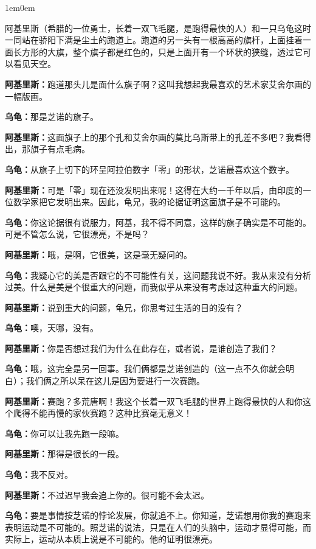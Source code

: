 \documentclass[
  12pt,
  twoside,
  openright,
  oldfontcommands,
]{memoir}
\newcommand{\dialogname}[1]{{\heifamily\bfseries #1}}
\newenvironment{dialogguide}{%
  \begin{adjustwidth}{1em}{0em}\kaitifamily\itshape\small%
}{%
  \end{adjustwidth}%
}
\begin{document}
\begin{dialogguide}
阿基里斯（希腊的一位勇士，长着一双飞毛腿，是跑得最快的人）和一只乌龟这时一同站在骄阳下满是尘土的跑道上。跑道的另一头有一根高高的旗杆，上面挂着一面长方形的大旗，整个旗子都是红色的，只是上面开有一个环状的狭缝，透过它可以看见天空。
\end{dialogguide}

\dialogname{阿基里斯：}跑道那头儿是面什么旗子啊？这叫我想起我最喜欢的艺术家艾舍尔画的一幅版画。

\dialogname{乌龟：}那是芝诺的旗子。

\dialogname{阿基里斯：}这面旗子上的那个孔和艾舍尔画的莫比乌斯带上的孔差不多吧？我看得出，那旗子有点毛病。

\dialogname{乌龟：}从旗子上切下的环呈阿拉伯数字「零」的形状，芝诺最喜欢这个数字。

\dialogname{阿基里斯：}可是「零」现在还没发明出来呢！这得在大约一千年以后，由印度的一位数学家把它发明出来。因此，龟兄，我的论据证明这面旗子是不可能的。

\dialogname{乌龟：}你这论据很有说服力，阿基，我不得不同意，这样的旗子确实是不可能的。可是不管怎么说，它很漂亮，不是吗？

\dialogname{阿基里斯：}哦，是啊，它很美，这是毫无疑问的。

\dialogname{乌龟：}我疑心它的美是否跟它的不可能性有关，这问题我说不好。我从来没有分析过美。什么是美是个很重大的问题，而我似乎从来没有考虑过这种重大的问题。

\dialogname{阿基里斯：}说到重大的问题，龟兄，你思考过生活的目的没有？

\dialogname{乌龟：}噢，天哪，没有。

\dialogname{阿基里斯：}你是否想过我们为什么在此存在，或者说，是谁创造了我们？

\dialogname{乌龟：}哦，这完全是另一回事。我们俩都是芝诺创造的（这一点不久你就会明白）；我们俩之所以呆在这儿是因为要进行一次赛跑。

\dialogname{阿基里斯：}赛跑？多荒唐啊！我这个长着一双飞毛腿的世界上跑得最快的人和你这个爬得不能再慢的家伙赛跑？这种比赛毫无意义！

\dialogname{乌龟：}你可以让我先跑一段嘛。

\dialogname{阿基里斯：}那得是很长的一段。

\dialogname{乌龟：}我不反对。

\dialogname{阿基里斯：}不过迟早我会追上你的。很可能不会太迟。

\dialogname{乌龟：}要是事情按芝诺的悖论发展，你就追不上。你知道，芝诺想用你我的赛跑来表明运动是不可能的。照芝诺的说法，只是在人们的头脑中，运动才显得可能，而实际上，运动从本质上说是不可能的。他的证明很漂亮。
\end{document}
